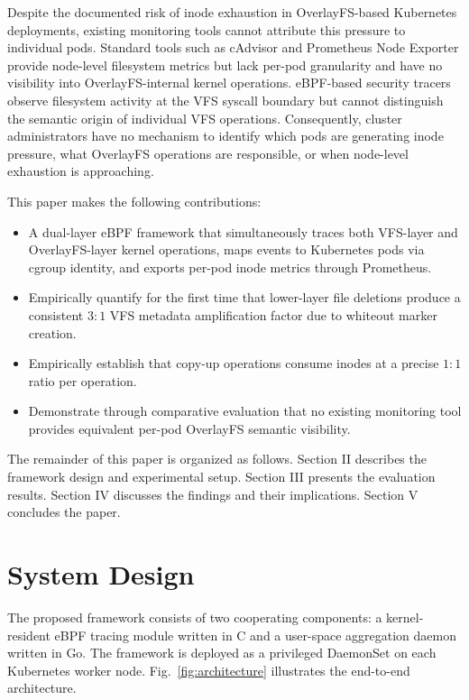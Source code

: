 \documentclass[conference]{IEEEtran}
\begin{document}
Despite the documented risk of inode exhaustion in OverlayFS-based Kubernetes deployments, existing monitoring tools cannot attribute this pressure to individual pods. Standard tools such as cAdvisor and Prometheus Node Exporter provide node-level filesystem metrics but lack per-pod granularity and have no visibility into OverlayFS-internal kernel operations. eBPF-based security tracers observe filesystem activity at the VFS syscall boundary but cannot distinguish the semantic origin of individual VFS operations. Consequently, cluster administrators have no mechanism to identify which pods are generating inode pressure, what OverlayFS operations are responsible, or when node-level exhaustion is approaching.

This paper makes the following contributions:

\begin{itemize}
\item A dual-layer eBPF framework that simultaneously traces both VFS-layer and OverlayFS-layer kernel operations, maps events to Kubernetes pods via cgroup identity, and exports per-pod inode metrics through Prometheus.
\item Empirically quantify for the first time that lower-layer file deletions produce a consistent $3\!:\!1$ VFS metadata amplification factor due to whiteout marker creation.
\item Empirically establish that copy-up operations consume inodes at a precise $1\!:\!1$ ratio per operation.
\item Demonstrate through comparative evaluation that no existing monitoring tool provides equivalent per-pod OverlayFS semantic visibility.
\end{itemize}

The remainder of this paper is organized as follows. Section II describes the framework design and experimental setup. Section III presents the evaluation results. Section IV discusses the findings and their implications. Section V concludes the paper.

\section{System Design}
\label{sec:design}

The proposed framework consists of two cooperating components: a kernel-resident eBPF tracing module written in C and a user-space aggregation daemon written in Go. The framework is deployed as a privileged DaemonSet on each Kubernetes worker node. Fig.~\ref{fig:architecture} illustrates the end-to-end architecture.
\end{document}
